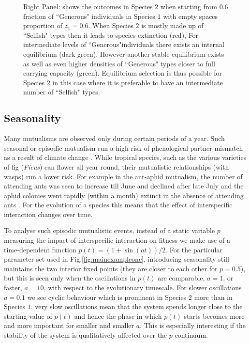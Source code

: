 \documentclass[12pt]{article}
\begin{document}
\begin{figure}
\begin{center}
{{Right Panel: shows the outcomes in Species $2$ when starting from $0.6$ fraction of ``Generous" individuals in Species $1$ with empty spaces proportion of $z_1 = 0.6$.
When Species $2$ is mostly made up of ``Selfish" types then it leads to species extinction (red), For intermediate levels of ``Generous"individuals there exists an internal equilibrium (dark green). However another stable equilibrium exists as well as even higher densities of ``Generous" types closer to full carrying capacity (green).
Equilibrium selection is thus possible for Species $2$ in this case where it is preferable to have an intermediate number of ``Selfish" types.
\label{fig:popdyn}
}
}
\end{center}
\end{figure}

\subsection{Seasonality}

Many mutualisms are observed only during certain periods of a year.
Such seasonal or episodic mutualism run a high risk of phenological partner mismatch as a result of climate change \citep{rafferty:Oikos:2015}.
While tropical species, such as the various varieties of fig (\textit{Ficus}) can flower all year round, their mutualistic relationships (with wasps) run a lower risk.
For example in the ant-aphid mutualism, the number of attending ants was seen to increase till June and declined after late July and the aphid colonies went rapidly (within a month) extinct in the absence of attending ants \citep{yao:Oikos:2000,yao:JIS:2009}.
For the evolution of a species this means that the effect of interspecific interaction changes over time.

To analyse such episodic mutualistic events, instead of a static variable $p$ measuring the impact of interspecific interaction on fitness we make use of a time-dependent function $p(t) = (1 + \sin(a t))/2 $.
For the particular parameter set used in Fig.\ref{fig:mainexampleone}, introducing seasonality still maintains the two interior fixed points (they are closer to each other for $p = 0.5$), but this is seen only when the oscillations in $p(t)$  are comparable, $a=1$, or faster, $a=10$, with respect to the evolutionary timescale.
For slower oscillations $a=0.1$ we see cyclic behaviour which is prominent in Species $2$ more than in Species $1$.
very slow oscillations mean that the system spends longer close to the starting value of $p(t)$ and hence the phase in which $p(t)$ starts becomes more and more important for smaller and smaller $a$. 
This is especially interesting if the stability of the system is qualitatively affected over the $p$ continuum.
\end{document}

